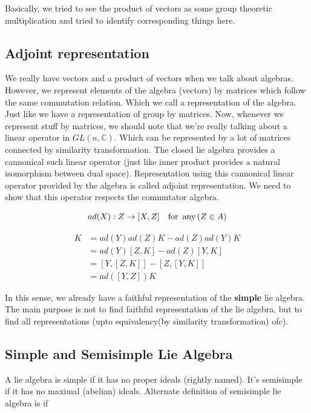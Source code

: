 \documentclass{report}
\begin{document}
\noindent Basically, we tried to see the product of vectors as some group theoretic multiplication and tried to identify corresponding things here.


\subsection{Adjoint representation}

\noindent We really have vectors and a product of vectors when we talk about algebras. However, we represent elements of the algebra (vectors) by matrices which follow the same commutation relation. Which we call a representation of the algebra. Just like we have a representation of group by matrices. Now, whenever we represent stuff by matrices, we should note that we're really talking about a linear operator in $GL(n,\mathbb{C})$. Which can be represented by a lot of matrices connected by similarity transformation. The closed lie algebra provides a cannonical such linear operator (just like inner product provides a natural isomorphism between dual space). Representation using this cannonical linear operator provided by the algebra is called adjoint representation. We need to show that this operator respects the commutator algebra.

$$ad(X) : Z \rightarrow [X,Z] \quad \textrm{for\, any} \, (Z\in A)$$

\begin{align}
  [ad(Y),ad(Z)]K &= ad(Y)ad(Z)K - ad(Z)ad(Y)K\\
                 &= ad(Y)[Z,K] - ad(Z)[Y,K]\\
                 &= [Y,[Z,K]] - [Z,[Y,K]]\\
                 &= ad([Y,Z])K
\end{align}

\noindent In this sense, we already have a faithful representation of the \textbf{simple} lie algebra. The main purpose is not to find faithful representation of the lie algebra, but to find all representations (upto equivalency(by similarity transformation) ofc).

\subsection{Simple and Semisimple Lie Algebra}

\noindent A lie algebra is simple if it has no proper ideals (rightly named). It's semisimple if it has no maximal (abelian) ideals. Alternate definition of semisimple lie algebra is if
\end{document}
